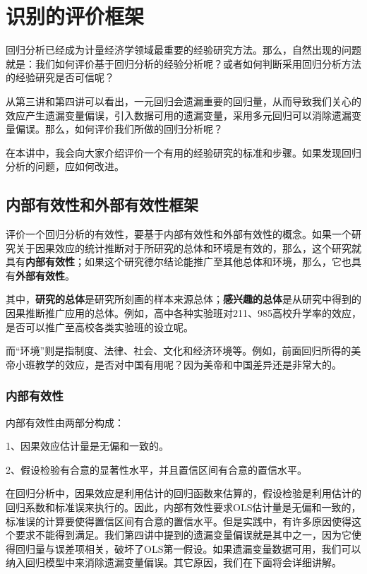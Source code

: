 \documentclass[cn,10pt,math=newtx,citestyle=gb7714-2015,bibstyle=gb7714-2015]{elegantbook}
\begin{document}
\chapter{识别的评价框架}

回归分析已经成为计量经济学领域最重要的经验研究方法。那么，自然出现的问题就是：我们如何评价基于回归分析的经验分析呢？或者如何判断采用回归分析方法的经验研究是否可信呢？

从第三讲和第四讲可以看出，一元回归会遗漏重要的回归量，从而导致我们关心的效应产生遗漏变量偏误，引入数据可用的遗漏变量，采用多元回归可以消除遗漏变量偏误。那么，如何评价我们所做的回归分析呢？

在本讲中，我会向大家介绍评价一个有用的经验研究的标准和步骤。如果发现回归分析的问题，应如何改进。

\section{内部有效性和外部有效性框架}
评价一个回归分析的有效性，要基于内部有效性和外部有效性的概念。如果一个研究关于因果效应的统计推断对于所研究的总体和环境是有效的，那么，这个研究就具有\textbf{内部有效性}；如果这个研究德尔结论能推广至其他总体和环境，那么，它也具有\textbf{外部有效性}。

其中，\textbf{研究的总体}是研究所刻画的样本来源总体；\textbf{感兴趣的总体}是从研究中得到的因果推断推广应用的总体。例如，高中各种实验班对211、985高校升学率的效应，是否可以推广至高校各类实验班的设立呢。

而“环境”则是指制度、法律、社会、文化和经济环境等。例如，前面回归所得的美帝小班教学的效应，是否对中国有用呢？因为美帝和中国差异还是非常大的。

\subsection{内部有效性}
内部有效性由两部分构成：

1、因果效应估计量是无偏和一致的。

2、假设检验有合意的显著性水平，并且置信区间有合意的置信水平。

在回归分析中，因果效应是利用估计的回归函数来估算的，假设检验是利用估计的回归系数和标准误来执行的。因此，内部有效性要求OLS估计量是无偏和一致的，标准误的计算要使得置信区间有合意的置信水平。但是实践中，有许多原因使得这个要求不能得到满足。我们第四讲中提到的遗漏变量偏误就是其中之一，因为它使得回归量与误差项相关，破坏了OLS第一假设。如果遗漏变量数据可用，我们可以纳入回归模型中来消除遗漏变量偏误。其它原因，我们在下面将会详细讲解。
\end{document}
